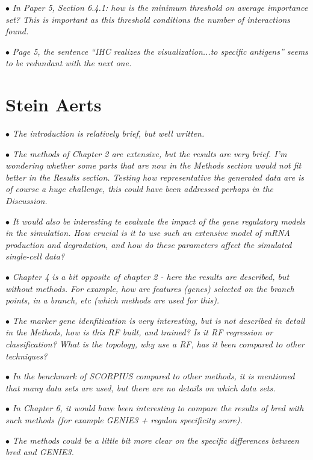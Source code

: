 \documentclass[10pt]{article}
\newcommand{\exam}[2][\  ]{\hspace{0pt}\marginpar{\color{red}#1}$\bullet$ \textit{#2}}
\newcommand{\imp}[1]{{\color{red} #1}}
\newcommand{\bigexclaim}{\raisebox{-0.1em}{\BigTriangleUp}\hspace{-0.32em}\llap{\small\textbf{!}}\hspace{0.32em}}
\newcommand{\tagimp}{\bigexclaim}
\newcommand{\tagtime}{{\Large $\hourglass$}}
\begin{document}
{\exam{In Paper 5, Section 6.4.1: how is the minimum threshold on average importance set? This is
	important as this threshold conditions the number of interactions found.}

\exam{Page 5, the sentence “IHC realizes the visualization...to specific antigens” seems to be
	redundant with the next one.}
 


\section{Stein Aerts}


\exam{The introduction is relatively brief, but well
written.}

\exam{The methods of Chapter 2 are extensive, but the results are very brief. I’m wondering whether
some parts that are now in the Methods section would not fit better in the Results section. Testing how
representative the generated data are is of course a huge challenge, this could have been addressed
perhaps in the Discussion.}


\exam[\tagimp \tagtime]{\imp{It would also be interesting te evaluate the impact of the gene regulatory
models in the simulation. How crucial is it to use such an extensive model of mRNA production and
degradation, and how do these parameters affect the simulated single-cell data?}}


\exam{Chapter 4 is a bit opposite
of chapter 2 - here the results are described, but without methods. For example, how are features
(genes) selected on the branch points, in a branch, etc (which methods are used for this).}

\exam{The marker gene idenfitication is very interesting, but is not described in detail in the Methods, how
is this RF built, and trained? Is it RF regression or classification? What is the topology, why use a RF,
has it been compared to other techniques?}

\exam{In the benchmark of SCORPIUS compared to other
methods, it is mentioned that many data sets are used, but there are no details on which data sets.}

 

\exam[\tagimp \tagtime]{\imp{In Chapter 6, it would have been interesting
to compare the results of bred with such methods (for example GENIE3 + regulon specificity score).}}

\exam[\tagimp \tagtime]{\imp{The methods could be a little bit more clear on the specific differences between bred and GENIE3.}}


}
\end{document}
